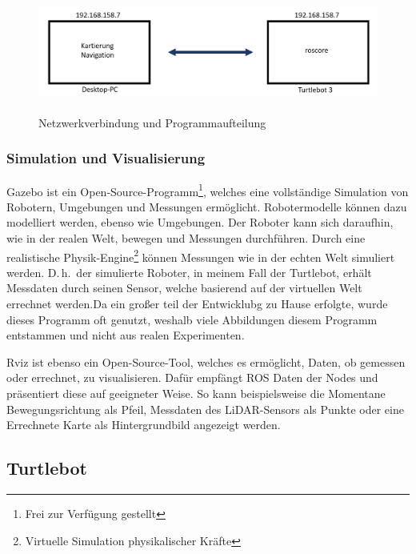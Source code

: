 {{{		\begin{figure}[H]
			\centering
			\includegraphics[height=4cm]{Bilder/network_turtlebot.png}
			\caption{Netzwerkverbindung und Programmaufteilung} 
			\label{pic:networkturtlebot}
		\end{figure}
		}
		
		\subsubsection{Simulation und Visualisierung}
		{
			Gazebo ist ein Open-Source-Programm\footnote{Frei zur Verfügung gestellt}, welches eine vollständige Simulation von Robotern, Umgebungen und Messungen ermöglicht. Robotermodelle können dazu modelliert werden, ebenso wie Umgebungen. Der Roboter kann sich daraufhin, wie in der realen Welt, bewegen und Messungen durchführen. Durch eine realistische Physik-Engine\footnote{Virtuelle Simulation physikalischer Kräfte} können Messungen wie in der echten Welt simuliert werden. D.\,h.\ der simulierte Roboter, in meinem Fall der Turtlebot, erhält Messdaten durch seinen Sensor, welche basierend auf der virtuellen Welt errechnet werden.Da ein großer teil der Entwicklubg zu Hause erfolgte, wurde dieses Programm oft genutzt, weshalb viele Abbildungen diesem Programm entstammen und nicht aus realen Experimenten.
			
			Rviz ist ebenso ein Open-Source-Tool, welches es ermöglicht, Daten, ob gemessen oder errechnet, zu visualisieren. Dafür empfängt ROS Daten der Nodes und präsentiert diese auf geeigneter Weise. So kann beispielsweise die Momentane Bewegungsrichtung als Pfeil, Messdaten des LiDAR-Sensors als Punkte oder eine Errechnete Karte als Hintergrundbild angezeigt werden. \parencite{rosvisgit}
			
			
		}
	}
	\subsection{Turtlebot}
	{
}}
